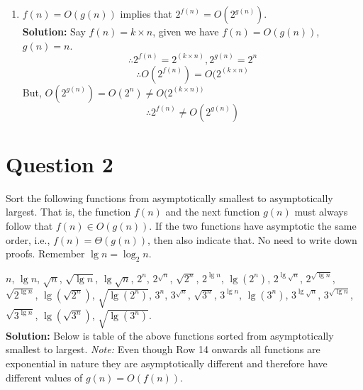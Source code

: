 \documentclass[11pt]{article}
\begin{document}
\begin{enumerate}
    \item $f(n)=O(g(n))$ implies that $2^{f(n)}=O(2^{g(n)})$. \\
    \textbf{Solution:}
    Say $f(n)=k \times n$, given we have $f(n)=O(g(n))$, $g(n)=n$. \\
	\begin{equation} \label{eq:16}
    \therefore 2^{f(n)} = 2^{(k \times n)}, 2^{g(n)} = 2^n
    \end{equation}
    \begin{equation} \label{eq:17}
    \therefore O(2^{f(n)}) = O(2^{(k \times n)}
    \end{equation}
    But, $O(2^{g(n)}) = O(2^{n}) \ne O(2^{(k \times n))}$
	\begin{equation}
	    \boxed{\therefore 2^{f(n)} \ne O(2^{g(n)})}
	\end{equation}

    \end{enumerate}
    

\section{Question 2}

Sort the following functions from asymptotically smallest to asymptotically largest. That is, the function $f(n)$ and the next function $g(n)$ must always follow that $f(n) \in O(g(n))$. If the two functions have asymptotic the same order, i.e., $f(n)=\Theta(g(n))$, then also indicate that. No need to write down proofs.  Remember $\lg n=\log_2 n$.
  
$n$, $\lg n$, $\sqrt{n}$, $\sqrt{\lg n}$, $\lg \sqrt{n}$, $2^n$, $2^{\sqrt{n}}$, $\sqrt{2^n}$, $2^{\lg n}$, $\lg(2^n)$, $2^{\lg \sqrt{n}}$, $2^{\sqrt{\lg n}}$, $\sqrt{2^{\lg n}}$, $\lg (\sqrt{2^n})$, $\sqrt{\lg (2^n)}$,  $3^n$, $3^{\sqrt{n}}$, $\sqrt{3^n}$, $3^{\lg n}$, $\lg(3^n)$, $3^{\lg \sqrt{n}}$, $3^{\sqrt{\lg n}}$, $\sqrt{3^{\lg n}}$, $\lg (\sqrt{3^n})$, $\sqrt{\lg (3^n)}$. \\

\textbf{Solution:} Below is table of the above functions sorted from asymptotically smallest to largest. \textit{Note:} Even though Row 14 onwards all functions are exponential in nature they are asymptotically different and therefore have different values of $g(n)=O(f(n))$.

\newcommand\rownumber{\stepcounter{rownumbers}\arabic{rownumbers}}
\end{document}
